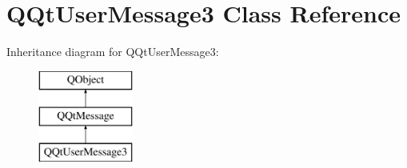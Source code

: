 \hypertarget{class_q_qt_user_message3}{}\section{Q\+Qt\+User\+Message3 Class Reference}
\label{class_q_qt_user_message3}
Inheritance diagram for Q\+Qt\+User\+Message3\+:\begin{figure}[H]
\begin{center}
\leavevmode
\includegraphics[height=3.000000cm]{class_q_qt_user_message3}
\end{center}
\end{figure}
